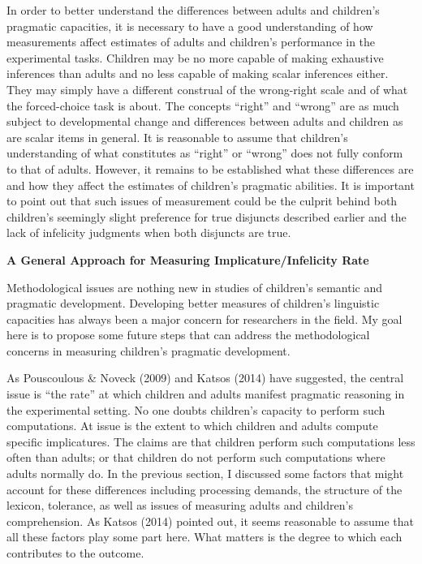 \documentclass[man]{apa6}
\theoremstyle{definition}
\theoremstyle{definition}
\theoremstyle{definition}
\theoremstyle{remark}
\begin{document}
In order to better understand the differences between adults and
children's pragmatic capacities, it is necessary to have a good
understanding of how measurements affect estimates of adults and
children's performance in the experimental tasks. Children may be no
more capable of making exhaustive inferences than adults and no less
capable of making scalar inferences either. They may simply have a
different construal of the wrong-right scale and of what the
forced-choice task is about. The concepts \enquote{right} and
\enquote{wrong} are as much subject to developmental change and
differences between adults and children as are scalar items in general.
It is reasonable to assume that children's understanding of what
constitutes as \enquote{right} or \enquote{wrong} does not fully conform
to that of adults. However, it remains to be established what these
differences are and how they affect the estimates of children's
pragmatic abilities. It is important to point out that such issues of
measurement could be the culprit behind both children's seemingly slight
preference for true disjuncts described earlier and the lack of
infelicity judgments when both disjuncts are true.

\textbf{A General Approach for Measuring Implicature/Infelicity Rate}

Methodological issues are nothing new in studies of children's semantic
and pragmatic development. Developing better measures of children's
linguistic capacities has always been a major concern for researchers in
the field. My goal here is to propose some future steps that can address
the methodological concerns in measuring children's pragmatic
development.

As Pouscoulous \& Noveck (2009) and Katsos (2014) have suggested, the
central issue is \enquote{the rate} at which children and adults
manifest pragmatic reasoning in the experimental setting. No one doubts
children's capacity to perform such computations. At issue is the extent
to which children and adults compute specific implicatures. The claims
are that children perform such computations less often than adults; or
that children do not perform such computations where adults normally do.
In the previous section, I discussed some factors that might account for
these differences including processing demands, the structure of the
lexicon, tolerance, as well as issues of measuring adults and children's
comprehension. As Katsos (2014) pointed out, it seems reasonable to
assume that all these factors play some part here. What matters is the
degree to which each contributes to the outcome.
\end{document}

